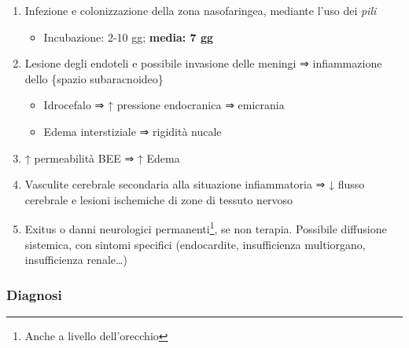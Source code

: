 \documentclass[italian,]{article}
\providecommand{\tightlist}{%
  \setlength{\itemsep}{0pt}\setlength{\parskip}{0pt}}
\begin{document}
\begin{enumerate}
\def\labelenumi{\arabic{enumi}.}
\setcounter{enumi}{-1}
\tightlist
\item
  Infezione e colonizzazione della zona nasofaringea, mediante l'uso dei
  \emph{pili}

  \begin{itemize}
  \tightlist
  \item
    Incubazione: 2-10 gg; \textbf{media: 7 gg}
  \end{itemize}
\item
  Lesione degli endoteli e possibile invasione delle meningi ⇒
  infiammazione dello \{spazio subaracnoideo\}

  \begin{itemize}
  \tightlist
  \item
    Idrocefalo ⇒ ↑ pressione endocranica ⇒ emicrania
  \item
    Edema interstiziale ⇒ rigidità nucale
  \end{itemize}
\item
  ↑ permeabilità BEE ⇒ ↑ Edema
\item
  Vasculite cerebrale secondaria alla situazione infiammatoria ⇒ ↓
  flusso cerebrale e lesioni ischemiche di zone di tessuto nervoso
\item
  Exitus o danni neurologici permanenti\footnote{Anche a livello
    dell'orecchio}, se non terapia. Possibile diffusione sistemica, con
  sintomi specifici (endocardite, insufficienza multiorgano,
  insufficienza renale\ldots{})
\end{enumerate}

\hypertarget{diagnosi-4}{%
\subsubsection{Diagnosi}\label{diagnosi-4}}
\end{document}
